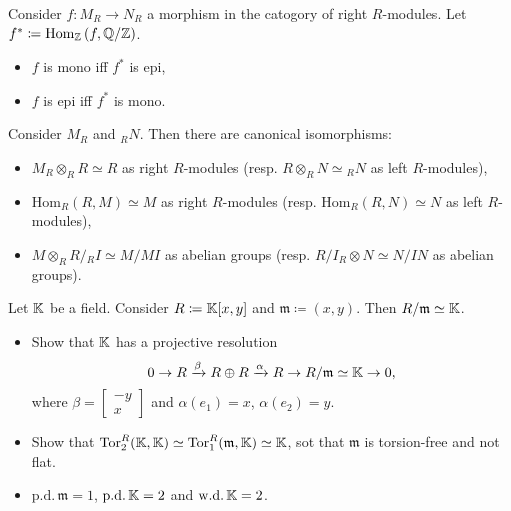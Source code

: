 \begin{lem}
	Consider $f\colon M_R \to N_R$ a morphism in the catogory of right $R$-modules.
	Let $f^* \coloneqq \mathrm{Hom}_{\mathbb{Z}}\left( f, \mathbb{Q}/\mathbb{Z} \right)$.
	\begin{itemize}
		\item $f$ is mono iff $f^*$ is epi,
		\item $f$ is epi iff $f^*$ is mono.
	\end{itemize}
\end{lem} 

\begin{lem}
	Consider $M_R$ and ${}_RN$. Then there are canonical isomorphisms:
	\begin{itemize}
		\item $M_R \otimes_R R \simeq R$ as right $R$-modules 
			(resp. $R \otimes_R N \simeq {}_RN$ as left $R$-modules),
		\item $\mathrm{Hom}_{ R}\left( R, M \right) \simeq M$ as right $R$-modules
			(resp. $\mathrm{Hom}_{ R}\left( R, N \right) \simeq N$ as left $R$-modules),
		\item $M \otimes_R R/{}_RI \simeq M/MI$ as abelian groups
			(resp. $R/I_R \otimes N \simeq N/IN$ as abelian groups).
	\end{itemize}
\end{lem} 

\begin{exr}
	Let $\mathbb{K}$ be a field.
	Consider $R \coloneqq \mathbb{K}[x,y]$ and $\mathfrak{m} \coloneqq (x,y)$.
	Then $R/\mathfrak{m} \simeq \mathbb{K}$.
	\begin{itemize}
		\item Show that $\mathbb{K}$ has a projective resolution
			\begin{equation}
			0 \to R \xrightarrow{\beta} R \oplus R \xrightarrow{\alpha} R \to
			R/\mathfrak{m} \simeq \mathbb{K} \to 0
			,\end{equation} 
			where $\beta = \begin{bmatrix}-y \\ x\end{bmatrix}$ and $\alpha(e_1) = x$, $\alpha(e_2) = y$.
		\item Show that $\mathrm{Tor}^R_2(\mathbb{K},\mathbb{K}) \simeq \mathrm{Tor}^R_1(\mathfrak{m}, \mathbb{K}) \simeq \mathbb{K}$,
			sot that $\mathfrak{m}$ is torsion-free and not flat.
		\item $\mathrm{p.d.}\, \mathfrak{m} = 1$, $\mathrm{p.d.}\, \mathbb{K} = 2$
			and $\mathrm{w.d.}\, \mathbb{K} = 2$.
	\end{itemize}
\end{exr} 

